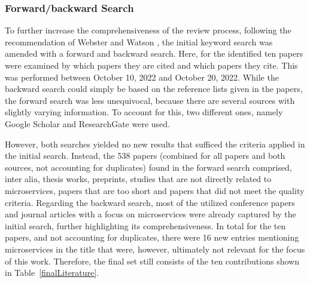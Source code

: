 \documentclass{bmcart}
\begin{document}
\subsubsection{Forward/backward Search}

To further increase the comprehensiveness of the review process, following the recommendation of Webster and Watson \cite{webster2002analyzing}, the initial keyword search was amended with a forward and backward search. Here, for the identified ten papers were examined by which papers they are cited and which papers they cite. This was performed between October 10, 2022 and October 20, 2022. While the backward search could simply be based on the reference lists given in the papers, the forward search was less unequivocal, because there are several sources with slightly varying information. To account for this, two different ones, namely Google Scholar and ResearchGate were used. 

However, both searches yielded no new results that sufficed the criteria applied in the initial search. 
Instead, the 538 papers (combined for all papers and both sources, not accounting for duplicates) found in the forward search comprised, inter alia, thesis works, preprints, studies that are not directly related to microservices, papers that are too short and papers that did not meet the quality criteria. Regarding the backward search, most of the utilized conference papers and journal articles with a focus on microservices were already captured by the initial search, further highlighting its comprehensiveness. In total for the ten papers, and not accounting for duplicates, there were 16 new entries mentioning microservices in the title that were, however, ultimately not relevant for the focus of this work. Therefore, the final set still consists of the ten contributions shown in Table~\ref{finalLiterature}.
\end{document}
